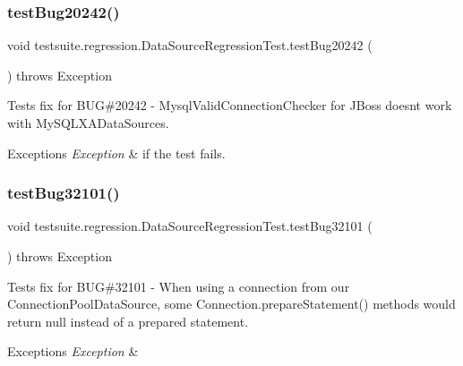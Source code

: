 \subsubsection{\texorpdfstring{test\+Bug20242()}{testBug20242()}}
{\footnotesize\ttfamily void testsuite.\+regression.\+Data\+Source\+Regression\+Test.\+test\+Bug20242 (\begin{DoxyParamCaption}{ }\end{DoxyParamCaption}) throws Exception}

Tests fix for B\+UG\#20242 -\/ Mysql\+Valid\+Connection\+Checker for J\+Boss doesn\textquotesingle{}t work with My\+S\+Q\+L\+X\+A\+Data\+Sources.


\begin{DoxyExceptions}{Exceptions}
{\em Exception} & if the test fails. \\
\hline
\end{DoxyExceptions}
\mbox{\label{classtestsuite_1_1regression_1_1_data_source_regression_test_afbc8307057c46d97d66b67f78f567cb5}} 
\subsubsection{\texorpdfstring{test\+Bug32101()}{testBug32101()}}
{\footnotesize\ttfamily void testsuite.\+regression.\+Data\+Source\+Regression\+Test.\+test\+Bug32101 (\begin{DoxyParamCaption}{ }\end{DoxyParamCaption}) throws Exception}

Tests fix for B\+UG\#32101 -\/ When using a connection from our Connection\+Pool\+Data\+Source, some Connection.\+prepare\+Statement() methods would return null instead of a prepared statement.


\begin{DoxyExceptions}{Exceptions}
{\em Exception} & \\
\hline
\end{DoxyExceptions}
\mbox{\label{classtestsuite_1_1regression_1_1_data_source_regression_test_a8996aec86e7e81696fa451b9d9b457f2}} 
